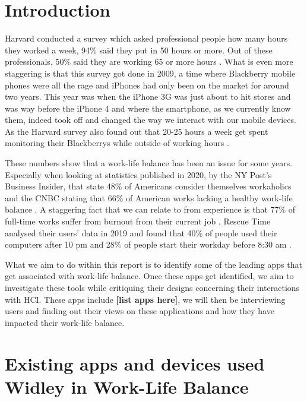 \documentclass{sigchi}
\begin{document}
\section{Introduction}
	Harvard conducted a survey which asked professional people how many hours they worked a week, 94\% said they put in 50 hours or more. Out of these professionals, 50\% said they are working 65 or more hours \cite{harvard_review}. What is even more staggering is that this survey got done in 2009, a time where Blackberry mobile phones were all the rage and iPhones had only been on the market for around two years. This year was when the iPhone 3G was just about to hit stores and was way before the iPhone 4 and where the smartphone, as we currently know them, indeed took off and changed the way we interact with our mobile devices. As the Harvard survey also found out that 20-25 hours a week get spent monitoring their Blackberrys while outside of working hours \cite{harvard_review}.  
	
	These numbers show that a work-life balance has been an issue for some years. Especially when looking at statistics published in 2020, by the NY Post's Business Insider, that state 48\% of Americans consider themselves workaholics and the CNBC stating that 66\% of American works lacking a healthy work-life balance \cite{work-life_2020}. A staggering fact that we can relate to from experience is that 77\% of full-time works suffer from burnout from their current job \cite{work-life_2020}. Rescue Time analysed their users' data in 2019 and found that 40\% of people used their computers after 10 pm and 28\% of people start their workday before 8:30 am \cite{rescuetime_study}.  
	
	What we aim to do within this report is to identify some of the leading apps that get associated with work-life balance. Once these apps get identified, we aim to investigate these tools while critiquing their designs concerning their interactions with HCI. These apps include \textbf{[list apps here]}, we will then be interviewing users and finding out their views on these applications and how they have impacted their work-life balance.
	
	  

\section{Existing apps and devices used Widley in Work-Life Balance}
	
\end{document}
